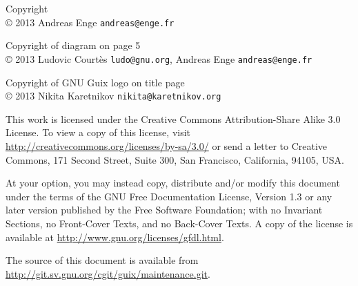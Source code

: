 \documentclass [t]{beamer}
\begin{document}
\begin {frame}
\small
Copyright \\
© 2013 Andreas Enge \texttt {andreas@enge.fr}

Copyright of diagram on page 5 \\
© 2013 Ludovic Courtès \texttt {ludo@gnu.org},
Andreas Enge \texttt {andreas@enge.fr}

Copyright of GNU Guix logo on title page \\
© 2013 Nikita Karetnikov \texttt {nikita@karetnikov.org}

\vspace {3mm}
This work is licensed under the \textcolor {blau}{Creative Commons
   Attribution-Share Alike 3.0} License. To view a copy of this
license, visit
\url{http://creativecommons.org/licenses/by-sa/3.0/} or send a
letter to Creative Commons, 171 Second Street, Suite 300, San
Francisco, California, 94105, USA.

\vspace {2mm}
At your option, you may instead copy, distribute and/or modify
this document under the terms of the \textcolor {blau}{GNU Free Documentation
   License, Version 1.3 or any later version} published by the Free
Software Foundation; with no Invariant Sections, no Front-Cover
Texts, and no Back-Cover Texts. A copy of the license is
available at \url{http://www.gnu.org/licenses/gfdl.html}.

\vspace {2mm}
The source of this document is available from
\url{http://git.sv.gnu.org/cgit/guix/maintenance.git}.
\end {frame}
\end{document}
